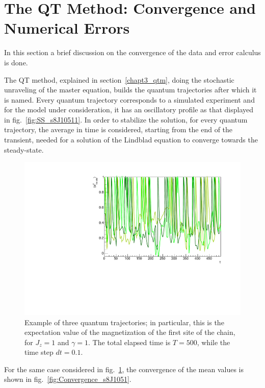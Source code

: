 \section{The QT Method: Convergence and Numerical Errors}
In this section a brief discussion on the convergence of the data and error calculus is done. 

The QT method, explained in section~\ref{chapt3_qtm}, doing the stochastic unraveling of the master equation, builds the quantum trajectories after which it is named.  Every quantum trajectory corresponds to a simulated experiment and for the model under consideration, it has an oscillatory profile as that displayed in fig.~\ref{fig:SS_s8J10511}. In order to stabilize the solution, for every quantum trajectory, the average in time is considered, starting from the end of the transient, needed for a solution of the Lindblad equation to converge towards the steady-state.

\begin{figure}[H]
    \centering
    \includegraphics[scale=0.7]{Figures/QTrajectories3.pdf}
    \captionsetup{width=1.\linewidth}
    \caption{Example of three quantum trajectories; in particular, this is the expectation value of the magnetization of the first site of the chain, for $J_z = 1$ and $\gamma = 1$. The total elapsed time is $T=500$, while the time step $dt = 0.1$.}
    \label{fig:QTrajectories3}
\end{figure}

For the same case considered in fig.~\ref{fig:QTrajectories3}, the convergence of the mean values is shown in fig.~\ref{fig:Convergence_s8J1051}. 

